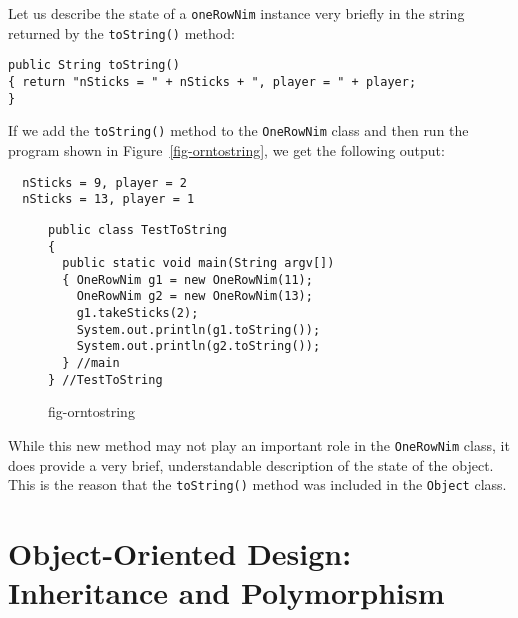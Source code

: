 \noindent Let us describe the state of a {\tt oneRowNim} instance very briefly
in the string returned by the {\tt toString()} method:

\begin{jjjlisting}
\begin{lstlisting}
public String toString()
{ return "nSticks = " + nSticks + ", player = " + player;
}
\end{lstlisting}
\end{jjjlisting}

\noindent If we add the {\tt toString()} method to the {\tt OneRowNim} class
and then run the program shown in Figure~\ref{fig-orntostring},
we get the following output:

\begin{jjjlisting}
\begin{lstlisting}
  nSticks = 9, player = 2
  nSticks = 13, player = 1
\end{lstlisting}
\end{jjjlisting}


\begin{figure}[h]
\jjjprogstart
\begin{jjjlisting}
\begin{lstlisting}
public class TestToString
{
  public static void main(String argv[])
  { OneRowNim g1 = new OneRowNim(11);
    OneRowNim g2 = new OneRowNim(13);
    g1.takeSticks(2);
    System.out.println(g1.toString());
    System.out.println(g2.toString());
  } //main
} //TestToString
\end{lstlisting}
\end{jjjlisting}
{fig-orntostring}
\end{figure}

\noindent While this new method may not play an important role in the
{\tt OneRowNim} class, it does provide a very brief, understandable
description of the state of the object.  This is the reason that the
{\tt toString()} method was included in the {\tt Object} class.

\section{Object-Oriented Design: Inheritance and Polymorphism}


